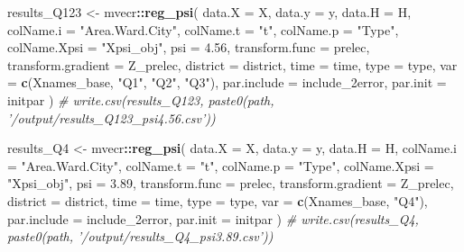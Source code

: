 \documentclass[
]{article}
\newenvironment{Shaded}{\begin{snugshade}}{\end{snugshade}}
\newcommand{\CommentTok}[1]{\textcolor[rgb]{0.56,0.35,0.01}{\textit{#1}}}
\newcommand{\DataTypeTok}[1]{\textcolor[rgb]{0.13,0.29,0.53}{#1}}
\newcommand{\FloatTok}[1]{\textcolor[rgb]{0.00,0.00,0.81}{#1}}
\newcommand{\KeywordTok}[1]{\textcolor[rgb]{0.13,0.29,0.53}{\textbf{#1}}}
\newcommand{\NormalTok}[1]{#1}
\newcommand{\OperatorTok}[1]{\textcolor[rgb]{0.81,0.36,0.00}{\textbf{#1}}}
\newcommand{\StringTok}[1]{\textcolor[rgb]{0.31,0.60,0.02}{#1}}
\begin{document}
\begin{Shaded}
\begin{Highlighting}[]
\NormalTok{results_Q123 <-}\StringTok{ }\NormalTok{mvecr}\OperatorTok{::}\KeywordTok{reg_psi}\NormalTok{(}
  \DataTypeTok{data.X =}\NormalTok{ X, }\DataTypeTok{data.y =}\NormalTok{ y, }\DataTypeTok{data.H =}\NormalTok{ H,}
  \DataTypeTok{colName.i =} \StringTok{"Area.Ward.City"}\NormalTok{, }\DataTypeTok{colName.t =} \StringTok{"t"}\NormalTok{, }
  \DataTypeTok{colName.p =} \StringTok{"Type"}\NormalTok{, }\DataTypeTok{colName.Xpsi =} \StringTok{"Xpsi_obj"}\NormalTok{,}
  \DataTypeTok{psi =} \FloatTok{4.56}\NormalTok{,}
  \DataTypeTok{transform.func =}\NormalTok{ prelec, }\DataTypeTok{transform.gradient =}\NormalTok{ Z_prelec,}
  \DataTypeTok{district =}\NormalTok{ district, }\DataTypeTok{time =}\NormalTok{ time, }\DataTypeTok{type =}\NormalTok{ type,}
  \DataTypeTok{var =} \KeywordTok{c}\NormalTok{(Xnames_base, }\StringTok{"Q1"}\NormalTok{, }\StringTok{"Q2"}\NormalTok{, }\StringTok{"Q3"}\NormalTok{),}
  \DataTypeTok{par.include =}\NormalTok{ include_2error,}
  \DataTypeTok{par.init =}\NormalTok{ initpar}
\NormalTok{)}
\CommentTok{# write.csv(results_Q123, paste0(path, '/output/results_Q123_psi4.56.csv'))}

\NormalTok{results_Q4 <-}\StringTok{ }\NormalTok{mvecr}\OperatorTok{::}\KeywordTok{reg_psi}\NormalTok{(}
  \DataTypeTok{data.X =}\NormalTok{ X, }\DataTypeTok{data.y =}\NormalTok{ y, }\DataTypeTok{data.H =}\NormalTok{ H,}
  \DataTypeTok{colName.i =} \StringTok{"Area.Ward.City"}\NormalTok{, }\DataTypeTok{colName.t =} \StringTok{"t"}\NormalTok{, }
  \DataTypeTok{colName.p =} \StringTok{"Type"}\NormalTok{, }\DataTypeTok{colName.Xpsi =} \StringTok{"Xpsi_obj"}\NormalTok{,}
  \DataTypeTok{psi =} \FloatTok{3.89}\NormalTok{,}
  \DataTypeTok{transform.func =}\NormalTok{ prelec, }\DataTypeTok{transform.gradient =}\NormalTok{ Z_prelec,}
  \DataTypeTok{district =}\NormalTok{ district, }\DataTypeTok{time =}\NormalTok{ time, }\DataTypeTok{type =}\NormalTok{ type,}
  \DataTypeTok{var =} \KeywordTok{c}\NormalTok{(Xnames_base, }\StringTok{"Q4"}\NormalTok{),}
  \DataTypeTok{par.include =}\NormalTok{ include_2error,}
  \DataTypeTok{par.init =}\NormalTok{ initpar}
\NormalTok{)}
\CommentTok{# write.csv(results_Q4, paste0(path, '/output/results_Q4_psi3.89.csv'))}


\end{Highlighting}
\end{Shaded}
\end{document}
